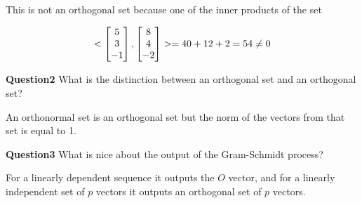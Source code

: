 \documentclass{article}
\begin{document}
This is not an orthogonal set because one of the inner products of the set

\begin{equation}
<\begin{bmatrix} 5 \\ 3 \\ -1 \\ \end{bmatrix}, \begin{bmatrix} 8 \\ 4 \\ -2 \\ \end{bmatrix}> = 40 + 12 + 2 = 54 \neq 0
\end{equation}

\bigskip

\noindent\textbf{Question2} What is the distinction between an orthogonal set and an orthogonal set?

\sol

An orthonormal set is an orthogonal set but the norm of the vectors from that set is equal to 1.

\bigskip
\bigskip

\noindent\textbf{Question3} What is nice about the output of the Gram-Schmidt process?

\sol

For a linearly dependent sequence it outputs the \(O\) vector,
and for a linearly independent set of \(p\) vectors it
outputs an orthogonal set of \(p\) vectors.
\end{document}
